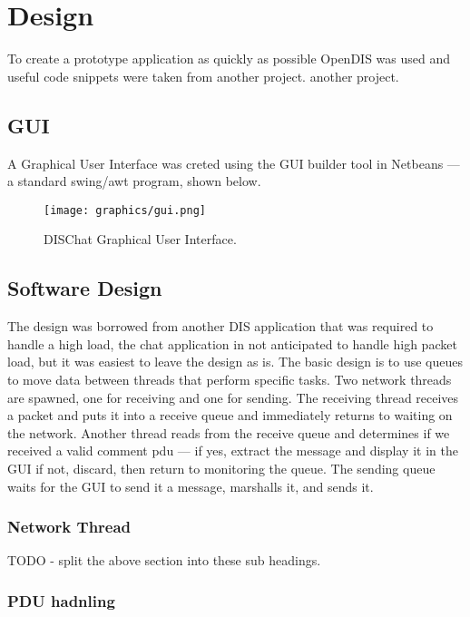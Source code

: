 \documentclass[12pt]{article}
\begin{document}
\section{Design}
\label{sec:design}
To create a prototype application as quickly as possible OpenDIS was
used and useful code snippets were taken from another project.
another project.

\subsection{GUI}
\label{sec:gui}
A Graphical User Interface was creted using the GUI builder tool in
Netbeans --- a standard swing/awt program, shown below.

\begin{figure}[!hbp]
\texttt{[image: graphics/gui.png]}
\caption{DISChat Graphical User Interface.}
\end{figure}

\subsection{Software Design}
\label{sec:software-design}
The design was borrowed from another DIS application that was required
to handle a high load, the chat application in not anticipated to
handle high packet load, but it was easiest to leave the design as
is. The basic design is to use queues to move data between threads
that perform specific tasks. Two network threads are spawned, one for
receiving and one for sending. The receiving thread receives a packet
and puts it into a receive queue and immediately returns to waiting on
the network. Another thread reads from the receive queue and
determines if we received a valid comment pdu --- if yes, extract the
message and display it in the GUI if not, discard, then return to
monitoring the queue. The sending queue waits for the GUI to send it a
message, marshalls it, and sends it.

\subsubsection{Network Thread}
\label{sec:network-thread}

TODO - split the above section into these sub headings.

\subsubsection{PDU hadnling}
\label{sec:pdu-handling}
\end{document}
